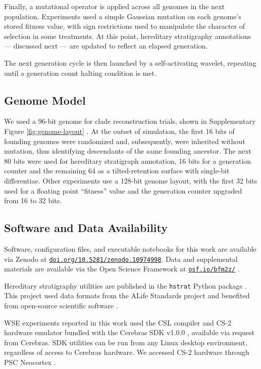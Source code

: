 Finally, a mutational operator is applied across all genomes in the next population.
Experiments used a simple Gaussian mutation on each genome's stored fitness value, with sign restrictions used to manipulate the character of selection in some treatments.
At this point, hereditary stratigraphy annotations --- discussed next --- are updated to reflect an elapsed generation.

The next generation cycle is then launched by a self-activating wavelet, repeating until a generation count halting condition is met.

\subsection{Genome Model}

We used a 96-bit genome for clade reconstruction trials, shown in Supplementary Figure \ref{fig:genome-layout} \citep{moreno2024supplement}.
At the outset of simulation, the first 16 bits of founding genomes were randomized and, subsequently, were inherited without mutation, thus identifying descendants of the same founding ancestor.
The next 80 bits were used for hereditary stratigraph annotation, 16 bits for a generation counter and the remaining 64 as a tilted-retention surface with single-bit differentiae.
Other experiments use a 128-bit genome layout, with the first 32 bits used for a floating point ``fitness'' value and the generation counter upgraded from 16 to 32 bits.

\subsection{Software and Data Availability}

Software, configuration files, and executable notebooks for this work are available via Zenodo at \href{https://doi.org/10.5281/zenodo.10974998}{\texttt{doi.org/10.5281/zenodo.10974998}}.
Data and supplemental materials are available via the Open Science Framework at \href{https://osf.io/bfm2z/}{\texttt{osf.io/bfm2z/}} \citep{foster2017open}.

Hereditary stratigraphy utilities are published in the \texttt{hstrat} Python package \citep{moreno2022hstrat}.
This project used data formats from the ALife Standards project \citep{lalejini2019data} and benefited from open-source scientific software \citep{huerta2016ete,2020SciPy-NMeth,harris2020array,reback2020pandas,mckinney-proc-scipy-2010,cock2009biopython,waskom2021seaborn,hunter2007matplotlib,moreno2024apc,moreno2024pecking,moreno2024hsurf,moreno2024wse,dolson2024phylotrackpy}.

WSE experiments reported in this work used the CSL compiler and CS-2 hardware emulator bundled with the Cerebras SDK v1.0.0 \citep{selig2022cerebras}, available via request from Cerebras.
SDK utilities can be run from any Linux desktop environment, regardless of access to Cerebras hardware.
We accessed CS-2 hardware through PSC Neocortex \citep{buitrago2021neocortex}.

